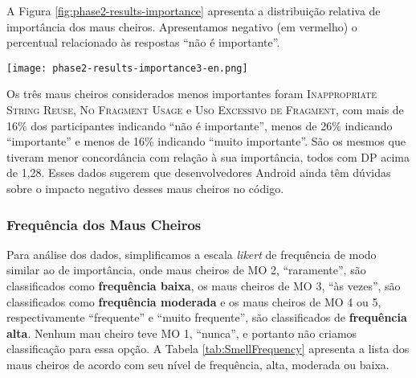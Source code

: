 A Figura \ref{fig:phase2-results-importance} apresenta a distribuição relativa de importância dos maus cheiros. Apresentamos negativo (em vermelho) o percentual relacionado às respostas ``não é importante''.

\begin{figure*}[!htb]
  \centering
  \texttt{[image: phase2-results-importance3-en.png]}
  \caption{Distribuição relativa de importância dos maus cheiros propostos.}
  \label{fig:phase2-results-importance}
\end{figure*}

Os três maus cheiros considerados menos importantes foram \textsc{\small Inappropriate String Reuse}, \textsc{\small No Fragment Usage} e \textsc{\small Uso Excessivo de Fragment}, com mais de 16\% dos participantes indicando ``não é importante'', menos de 26\% indicando ``importante'' e menos de 16\% indicando ``muito importante''. São os mesmos que tiveram menor concordância com relação à sua importância, todos com DP acima de 1,28. Esses dados sugerem que desenvolvedores Android ainda têm dúvidas sobre o impacto negativo desses maus cheiros no código.


\subsubsection{Frequência dos Maus Cheiros}

Para análise dos dados, simplificamos a escala \textit{likert} de frequência de modo similar ao de importância, onde maus cheiros de MO 2, ``raramente'', são classificados como \textbf{\small frequência baixa}, os maus cheiros de MO 3, ``às vezes'', são classificados como \textbf{\small frequência moderada} e os maus cheiros de MO 4 ou 5, respectivamente ``frequente'' e ``muito frequente'', são classificados de \textbf{\small frequência alta}. Nenhum mau cheiro teve MO 1, ``nunca'', e portanto não criamos classificação para essa opção. A Tabela \ref{tab:SmellFrequency} apresenta a lista dos maus cheiros de acordo com seu nível de frequência, alta, moderada ou baixa.

